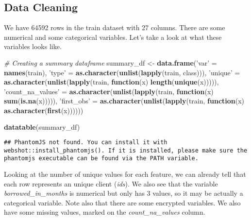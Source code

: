 \documentclass[]{article}
\newenvironment{Shaded}{\begin{snugshade}}{\end{snugshade}}
\newcommand{\KeywordTok}[1]{\textcolor[rgb]{0.13,0.29,0.53}{\textbf{#1}}}
\newcommand{\StringTok}[1]{\textcolor[rgb]{0.31,0.60,0.02}{#1}}
\newcommand{\CommentTok}[1]{\textcolor[rgb]{0.56,0.35,0.01}{\textit{#1}}}
\newcommand{\ControlFlowTok}[1]{\textcolor[rgb]{0.13,0.29,0.53}{\textbf{#1}}}
\newcommand{\NormalTok}[1]{#1}
\begin{document}
\hypertarget{data-cleaning}{\subsection{Data
Cleaning}\label{data-cleaning}}

We have 64592 rows in the train dataset with 27 columns. There are some
numerical and some categorical variables. Let's take a look at what
these variables looks like.

\begin{Shaded}
\begin{Highlighting}[]
\CommentTok{# Creating a summary dataframe}
\NormalTok{summary_df <-}\StringTok{ }\KeywordTok{data.frame}\NormalTok{(}\StringTok{'var'}\NormalTok{ =}\StringTok{ }\KeywordTok{names}\NormalTok{(train), }
                         \StringTok{'type'}\NormalTok{ =}\StringTok{ }\KeywordTok{as.character}\NormalTok{(}\KeywordTok{unlist}\NormalTok{(}\KeywordTok{lapply}\NormalTok{(train, class))), }
                         \StringTok{'unique'}\NormalTok{ =}\StringTok{ }\KeywordTok{as.character}\NormalTok{(}\KeywordTok{unlist}\NormalTok{(}\KeywordTok{lapply}\NormalTok{(train, }\ControlFlowTok{function}\NormalTok{(x) }\KeywordTok{length}\NormalTok{(}\KeywordTok{unique}\NormalTok{(x))))), }
                         \StringTok{'count_na_values'}\NormalTok{ =}\StringTok{ }\KeywordTok{as.character}\NormalTok{(}\KeywordTok{unlist}\NormalTok{(}\KeywordTok{lapply}\NormalTok{(train, }\ControlFlowTok{function}\NormalTok{(x) }\KeywordTok{sum}\NormalTok{(}\KeywordTok{is.na}\NormalTok{(x))))),}
                         \StringTok{'first_obs'}\NormalTok{ =}\StringTok{ }\KeywordTok{as.character}\NormalTok{(}\KeywordTok{unlist}\NormalTok{(}\KeywordTok{lapply}\NormalTok{(train, }\ControlFlowTok{function}\NormalTok{(x) }\KeywordTok{as.character}\NormalTok{(}\KeywordTok{first}\NormalTok{(x))))))}

\KeywordTok{datatable}\NormalTok{(summary_df)}
\end{Highlighting}
\end{Shaded}

\begin{verbatim}
## PhantomJS not found. You can install it with webshot::install_phantomjs(). If it is installed, please make sure the phantomjs executable can be found via the PATH variable.
\end{verbatim}

\hypertarget{htmlwidget-bf0241a3f7b9cb185471}{}

Looking at the number of unique values for each feature, we can already
tell that each row represents an unique client (\emph{ids}). We also see
that the variable \emph{borrowed\_in\_months} is numerical but only has
3 values, so it may be actually a categorical variable. Note also that
there are some encrypted variables. We also have some missing values,
marked on the \emph{count\_na\_values} column.
\end{document}
